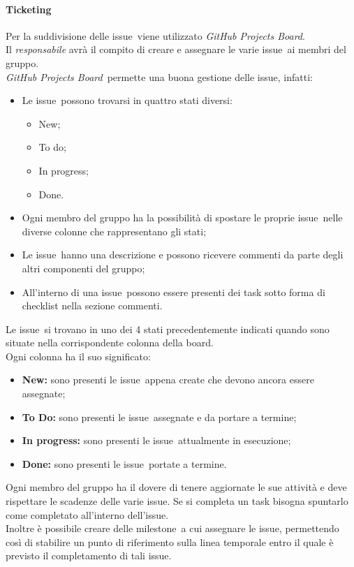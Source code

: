       \paragraph{Ticketing}
        Per la suddivisione delle issue\glo\ viene utilizzato \textit{GitHub Projects Board}\glo.\\
        Il \textit{responsabile} avrà il compito di creare e assegnare le varie issue\glo\ ai membri del gruppo.\\
        \textit{GitHub Projects Board}\glo\ permette una buona gestione delle issue\glo, infatti:
        \begin{itemize}
          \item Le issue\glo\ possono trovarsi in quattro stati diversi:
          \begin{itemize}
            \item New;
            \item To do;
            \item In progress;
            \item Done.
          \end{itemize}
          \item Ogni membro del gruppo ha la possibilità di spostare le proprie issue\glo\ nelle diverse colonne che rappresentano gli stati;
          \item Le issue\glo\ hanno una descrizione e possono ricevere commenti da parte degli altri componenti del gruppo;
          \item All'interno di una issue\glo\ possono essere presenti dei task sotto forma di checklist nella sezione commenti.
        \end{itemize}
        Le issue\glo\ si trovano in uno dei 4 stati precedentemente indicati quando sono situate nella corrispondente colonna della board.\\
        Ogni colonna ha il suo significato:
        \begin{itemize}
          \item \textbf{New:} sono presenti le issue\glo\ appena create che devono ancora essere assegnate;
          \item \textbf{To Do:} sono presenti le issue\glo\ assegnate e da portare a termine;
          \item \textbf{In progress:} sono presenti le issue\glo\ attualmente in esecuzione;
          \item \textbf{Done:} sono presenti le issue\glo\ portate a termine.
        \end{itemize}
        Ogni membro del gruppo ha il dovere di tenere aggiornate le sue attività e deve rispettare le scadenze delle varie issue\glo.
        Se si completa un task bisogna spuntarlo come completato all'interno dell'issue\glo.\\
        Inoltre è possibile creare delle milestone\glo\ a cui assegnare le issue\glo, permettendo così di stabilire un punto di riferimento 
        sulla linea temporale entro il quale è previsto il completamento di tali issue\glo.

